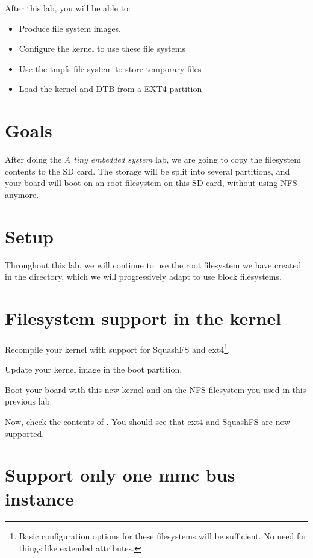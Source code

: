 
After this lab, you will be able to:
\begin{itemize}
\item Produce file system images.
\item Configure the kernel to use these file systems
\item Use the tmpfs file system to store temporary files
\item Load the kernel and DTB from a EXT4 partition
\end{itemize}

\section{Goals}

After doing the {\em A tiny embedded system} lab, we are going to copy
the filesystem contents to the SD card. The storage will be
split into several partitions, and your board will boot
on an root filesystem on this SD card, without using NFS anymore.

\section{Setup}

Throughout this lab, we will continue to use the root filesystem we
have created in the 
directory, which we will progressively adapt to use block filesystems.

\section{Filesystem support in the kernel}

Recompile your kernel with support for SquashFS and ext4\footnote{Basic
configuration options for these filesystems will be sufficient. No need
for things like extended attributes.}.

Update your kernel image in the boot partition.

Boot your board with this new kernel and on the NFS filesystem you
used in this previous lab.

Now, check the contents of . You should see
 that ext4 and SquashFS are now supported.

 \section{Support only one mmc bus instance}

